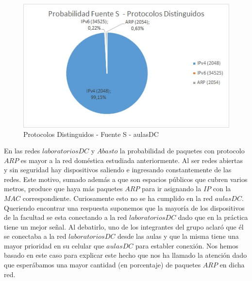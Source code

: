 \begin{figure}[h!]
\centering
\includegraphics[scale=0.7]{./img/probaS_aulasDC.jpg}
\caption{Protocolos Distinguidos - Fuente S - aulasDC}
\end{figure}

En las redes $laboratoriosDC$ y $Abasto$ la probabilidad de paquetes con protocolo $ARP$ es mayor a la red doméstica estudiada anteriormente. 
Al ser redes abiertas y sin seguridad hay dispositivos saliendo e ingresando constantemente de las redes. Este motivo, sumado además a que 
son espacios públicos que cubren varios metros, produce que haya más paquetes $ARP$ para ir asignando la $IP$ con la $MAC$ correspondiente. 
Curiosamente esto no se ha cumplido en la red $aulasDC$. Queriendo encontrar una respuesta suponemos que la mayoría de los dispositivos de la facultad
se esta conectando a la red $laboratoriosDC$ dado que en la práctica tiene un mejor señal. Al debatirlo, uno de los integrantes del grupo aclaró que
él se conectaba a la red $laboratoriosDC$ desde las aulas y que la misma tiene una mayor prioridad en su celular que $aulasDC$ para establer conexión.
Nos hemos basado en este caso para explicar este hecho que nos ha llamado la atención dado que esperábamos una mayor cantidad 
(en porcentaje) de paquetes $ARP$ en dicha red.\\


%

%

%

